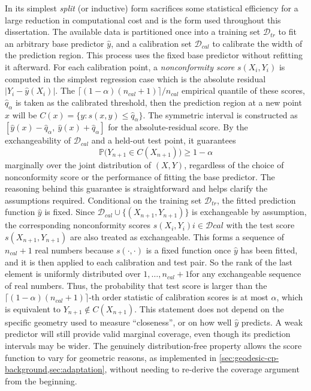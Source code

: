 \documentclass[11pt,a4paper]{report}
\begin{document}
In its simplest \emph{split} (or inductive) form \citep{lei2018} sacrifices some statistical efficiency for a large reduction in computational cost and is the form used throughout this dissertation. The available data is partitioned once into a training set $\mathcal{D}_{tr}$ to fit an arbitrary base predictor $\hat y$, and a calibration set $\mathcal{D}_{cal}$ to calibrate the width of the prediction region. This process uses the fixed base predictor without refitting it afterward. For each calibration point, a \emph{nonconformity score} $s(X_i,Y_i)$ is computed in the simplest regression case which is the absolute residual $|Y_i - \hat y(X_i)|$.  The $\lceil (1-\alpha)(n_{cal}+1)\rceil / n_{cal}$ empirical quantile of these scores, $\hat q_\alpha$ is taken as the calibrated threshold, then the prediction region at a new point $x$ will be $C(x) = \{y : s(x,y) \le \hat q_\alpha\}$. The symmetric interval is constructed as $[\hat y(x) - \hat q_\alpha,\ \hat y(x) + \hat q_\alpha]$ for the absolute-residual score. By the exchangeability of $\mathcal{D}_{cal}$ and a held-out test point, it guarantees
\begin{equation}
    \mathbb{P}\big(Y_{n+1} \in C(X_{n+1})\big) \ge 1 - \alpha
\end{equation}
marginally over the joint distribution of $(X,Y)$, regardless of the choice of nonconformity score or the performance of fitting the base predictor. The reasoning behind this guarantee is straightforward and helps clarify the assumptions required. Conditional on the training set $\mathcal{D}_{tr}$, the fitted prediction function $\hat y$ is fixed. Since $\mathcal{D}_{cal}\cup\{(X_{n+1},Y_{n+1})\}$ is exchangeable by assumption, the corresponding nonconformity scores ${s(X_i,Y_i)}{i\in\mathcal{D}{cal}}$ with the test score $s(X_{n+1},Y_{n+1})$ are also treated as exchangeable. This forms a sequence of $n_{cal}+1$ real numbers because $s(\cdot,\cdot)$ is a fixed function once $\hat y$ has been fitted, and it is then applied to each calibration and test pair. So the rank of the last element is uniformly distributed over ${1,\dots,n_{cal}+1}$for any exchangeable sequence of real numbers. Thus, the probability that test score is larger than the $\lceil(1-\alpha)(n_{cal}+1)\rceil$-th order statistic of calibration scores is at most $\alpha$, which is equivalent to $Y_{n+1}\notin C(X_{n+1})$. This statement does not depend on the specific geometry used to measure ``closeness'', or on how well $\hat y$ predicts. A weak predictor will still provide valid marginal coverage, even though its prediction intervals may be wider. The genuinely distribution-free property allows the score function to vary for geometric reasons, as implemented in \cref{sec:geodesic-cp-background,sec:adaptation}, without needing to re-derive the coverage argument from the beginning.
\end{document}
